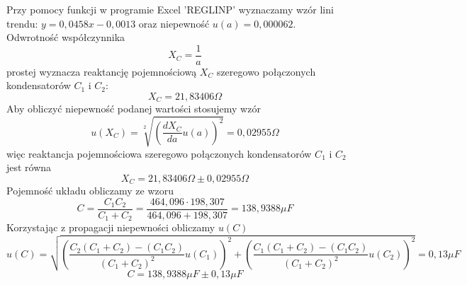 \documentclass{article}
\begin{document}
Przy pomocy funkcji w programie Excel 'REGLINP' wyznaczamy wzór lini trendu: $y = 0,0458x - 0,0013$ oraz niepewność $u(a) = 0,000062$.\\
Odwrotność współczynnika 
$$X_C = \frac{1}{a}$$
prostej wyznacza reaktancję pojemnościową $X_C$ szeregowo połączonych kondensatorów $C_1$ i $C_2$:
$$X_C = 21,83406 \Omega$$ 
Aby obliczyć niepewność podanej wartości stosujemy wzór
$$u(X_C) = \sqrt[2]{(\frac{dX_C}{da}u(a))^2} = 0,02955 \Omega$$
więc reaktancja pojemnościowa szeregowo połączonych kondensatorów $C_1$ i $C_2$ jest równa
$$X_C = 21,83406 \Omega \pm 0,02955 \Omega$$
Pojemność układu obliczamy ze wzoru
$$C = \frac{C_1C_2}{C_1+C_2} = \frac{464,096
 \cdot 198,307}{464,096 + 198,307} = 138,9388 \mu F$$
Korzystając z propagacji niepewności obliczamy $u(C)$
$$u(C) = \sqrt{(\frac{C_2(C_1+C_2)-(C_1C_2)}{(C_1+C_2)^2}u(C_1))^2 + (\frac{C_1(C_1+C_2)-(C_1C_2)}{(C_1+C_2)^2}u(C_2))^2} = 0,13 \mu F$$
$$C = 138,9388 \mu F \pm 0,13 \mu F$$
\\\\
\end{document}
